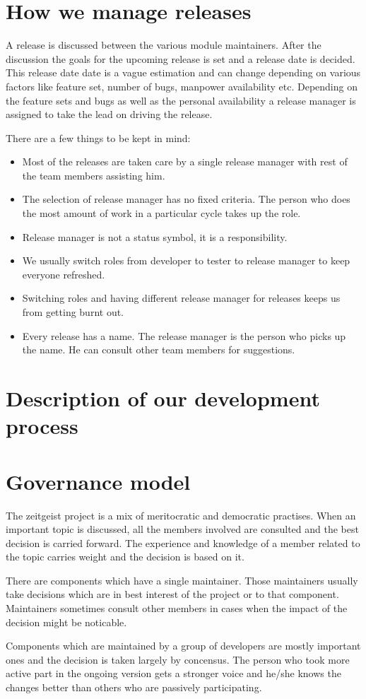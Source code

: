 \section{How we manage releases}
A release is discussed between the various module maintainers. 
After the discussion the goals for the upcoming release is set 
and a release date is decided. This release date date is a vague 
estimation and can change depending on various factors like 
feature set, number of bugs, manpower availability etc. 
Depending on the feature sets and bugs as well as the personal 
availability a release manager is assigned to take the lead 
on driving the release.

There are a few things to be kept in mind:
\begin{itemize}
\item Most of the releases are taken care by a single release manager 
with rest of the team members assisting him. 
\item The selection of release manager has no fixed criteria. The 
person who does the most amount of work in a particular cycle takes 
up the role.
\item Release manager is not a status symbol, it is a responsibility.
\item We usually switch roles from developer to tester to 
release manager to keep everyone refreshed.
\item Switching roles and having different release manager for releases 
keeps us from getting burnt out.
\item Every release has a name. The release manager is the person who 
picks up the name. He can consult other team members for suggestions.
\end{itemize}

\section{Description of our development process}
\section{Governance model}

The zeitgeist project is a mix of meritocratic and democratic practises. 
When an important topic is discussed, all the members involved are 
consulted and the best decision is carried forward. The experience and 
knowledge of a member related to the topic carries weight and the decision 
is based on it.

There are components which have a single maintainer. Those maintainers usually 
take decisions which are in best interest of the project or to that component. 
Maintainers sometimes consult other members in cases when the impact of the 
decision might be noticable. 

Components which are maintained by a group of developers are mostly important 
ones and the decision is taken largely by concensus. The person who took more 
active part in the ongoing version gets a stronger voice and he/she knows the 
changes better than others who are passively participating. 